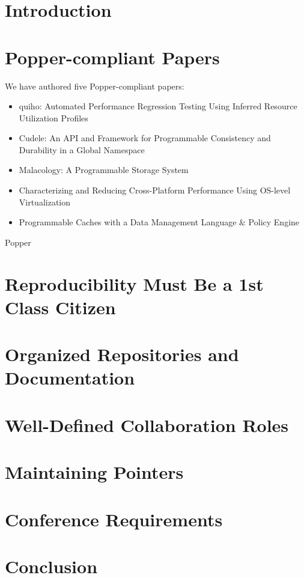\section{Introduction}

\section{Popper-compliant Papers}

We have authored five Popper-compliant papers:
\begin{itemize}

\item quiho: Automated Performance Regression Testing Using Inferred
Resource Utilization Profiles

\item Cudele: An API and Framework for Programmable Consistency and
Durability in a Global Namespace

\item Malacology: A Programmable Storage System

\item Characterizing and Reducing Cross-Platform Performance Using
OS-level Virtualization

\item Programmable Caches with a Data Management Language \& Policy Engine

\end{itemize}

Popper 


\section{Reproducibility Must Be a 1st Class Citizen}

\section{Organized Repositories and Documentation}

\section{Well-Defined Collaboration Roles}

\section{Maintaining Pointers}



\section{Conference Requirements}

\section{Conclusion}
